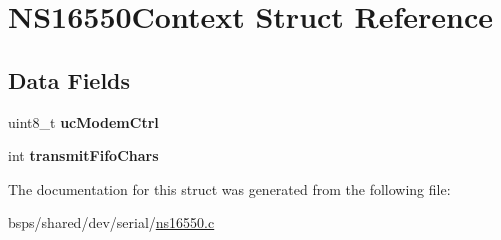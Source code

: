 \hypertarget{structNS16550Context}{}\section{N\+S16550\+Context Struct Reference}
\label{structNS16550Context}
\subsection*{Data Fields}
\begin{DoxyCompactItemize}
\item 
\mbox{\label{structNS16550Context_aae33cbb3cf9db4bf9af3c26dc38a9a84}} 
uint8\+\_\+t {\bfseries uc\+Modem\+Ctrl}
\item 
\mbox{\label{structNS16550Context_ab0eed978ed7e573f079bc6981f50becd}} 
int {\bfseries transmit\+Fifo\+Chars}
\end{DoxyCompactItemize}


The documentation for this struct was generated from the following file\+:\begin{DoxyCompactItemize}
\item 
bsps/shared/dev/serial/\mbox{\hyperlink{ns16550_8c}{ns16550.\+c}}\end{DoxyCompactItemize}
